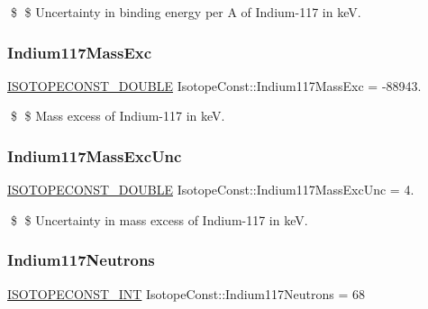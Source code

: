 \$ \$ Uncertainty in binding energy per A of Indium-\/117 in keV. \mbox{\label{group___isotope_const-_indium-_in117_ga4a9718027c15179e442d5b432b3e45cc}} 
\subsubsection{\texorpdfstring{Indium117\+Mass\+Exc}{Indium117MassExc}}
{\footnotesize\ttfamily \mbox{\hyperlink{group___isotope_const-_macros_ga8f45a7272ce02c0b4c65c44636ed719a}{I\+S\+O\+T\+O\+P\+E\+C\+O\+N\+S\+T\+\_\+\+D\+O\+U\+B\+LE}} Isotope\+Const\+::\+Indium117\+Mass\+Exc = -\/88943.}

\$ \$ Mass excess of Indium-\/117 in keV. \mbox{\label{group___isotope_const-_indium-_in117_ga794de3c74a78ec2ed10d3a0be21dfc7a}} 
\subsubsection{\texorpdfstring{Indium117\+Mass\+Exc\+Unc}{Indium117MassExcUnc}}
{\footnotesize\ttfamily \mbox{\hyperlink{group___isotope_const-_macros_ga8f45a7272ce02c0b4c65c44636ed719a}{I\+S\+O\+T\+O\+P\+E\+C\+O\+N\+S\+T\+\_\+\+D\+O\+U\+B\+LE}} Isotope\+Const\+::\+Indium117\+Mass\+Exc\+Unc = 4.}

\$ \$ Uncertainty in mass excess of Indium-\/117 in keV. \mbox{\label{group___isotope_const-_indium-_in117_gaedb6becda9a8672b1e565fb32aa70253}} 
\subsubsection{\texorpdfstring{Indium117\+Neutrons}{Indium117Neutrons}}
{\footnotesize\ttfamily \mbox{\hyperlink{group___isotope_const-_macros_ga5f18360b3e99483a35c32d789e62621c}{I\+S\+O\+T\+O\+P\+E\+C\+O\+N\+S\+T\+\_\+\+I\+NT}} Isotope\+Const\+::\+Indium117\+Neutrons = 68}

